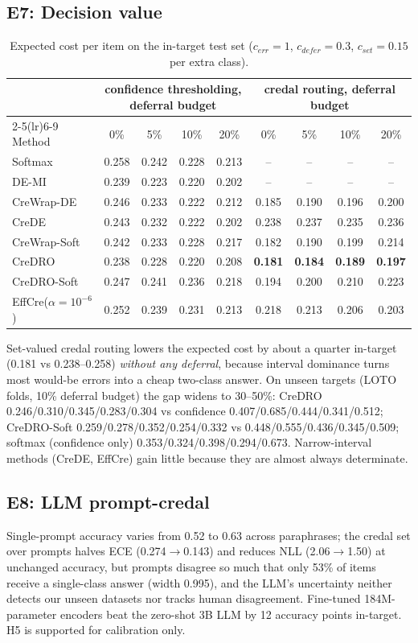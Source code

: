\documentclass[11pt,a4paper]{article}
\newcommand{\best}[1]{\textbf{#1}}
\begin{document}
\subsection{E7: Decision value}

\begin{table}[h]
\centering\small
\begin{tabular}{l cccc cccc}
\toprule
 & \multicolumn{4}{c}{confidence thresholding, deferral budget} & \multicolumn{4}{c}{credal routing, deferral budget} \\
\cmidrule(lr){2-5}\cmidrule(lr){6-9}
Method & 0\% & 5\% & 10\% & 20\% & 0\% & 5\% & 10\% & 20\% \\
\midrule
Softmax & 0.258 & 0.242 & 0.228 & 0.213 & -- & -- & -- & -- \\
DE-MI & 0.239 & 0.223 & 0.220 & 0.202 & -- & -- & -- & -- \\
CreWrap-DE & 0.246 & 0.233 & 0.222 & 0.212 & 0.185 & 0.190 & 0.196 & 0.200 \\
CreDE & 0.243 & 0.232 & 0.222 & 0.202 & 0.238 & 0.237 & 0.235 & 0.236 \\
CreWrap-Soft & 0.242 & 0.233 & 0.228 & 0.217 & 0.182 & 0.190 & 0.199 & 0.214 \\
CreDRO & 0.238 & 0.228 & 0.220 & 0.208 & \best{0.181} & \best{0.184} & \best{0.189} & \best{0.197} \\
CreDRO-Soft & 0.247 & 0.241 & 0.236 & 0.218 & 0.194 & 0.200 & 0.210 & 0.223 \\
EffCre($\alpha{=}10^{-6}$) & 0.252 & 0.239 & 0.231 & 0.213 & 0.218 & 0.213 & 0.206 & 0.203 \\
\bottomrule
\end{tabular}
\caption{Expected cost per item on the in-target test set ($c_{err}=1$, $c_{defer}=0.3$, $c_{set}=0.15$ per extra class).}
\label{tab:e7}
\end{table}

Set-valued credal routing lowers the expected cost by about a quarter in-target (0.181 vs 0.238--0.258) \emph{without any deferral}, because interval dominance turns most would-be errors into a cheap two-class answer. On unseen targets (LOTO folds, 10\% deferral budget) the gap widens to 30--50\%: CreDRO 0.246/0.310/0.345/0.283/0.304 vs confidence 0.407/0.685/0.444/0.341/0.512; CreDRO-Soft 0.259/0.278/0.352/0.254/0.332 vs 0.448/0.555/0.436/0.345/0.509; softmax (confidence only) 0.353/0.324/0.398/0.294/0.673. Narrow-interval methods (CreDE, EffCre) gain little because they are almost always determinate.

\subsection{E8: LLM prompt-credal}
Single-prompt accuracy varies from 0.52 to 0.63 across paraphrases; the credal set over prompts halves ECE (0.274$\to$0.143) and reduces NLL (2.06$\to$1.50) at unchanged accuracy, but prompts disagree so much that only 53\% of items receive a single-class answer (width 0.995), and the LLM's uncertainty neither detects our unseen datasets nor tracks human disagreement. Fine-tuned 184M-parameter encoders beat the zero-shot 3B LLM by 12 accuracy points in-target. H5 is supported for calibration only.
\end{document}
